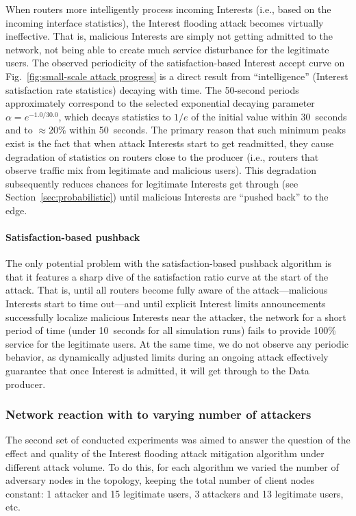 When routers more intelligently process incoming Interests (i.e., based on the incoming interface statistics), the Interest flooding attack becomes virtually ineffective.
That is, malicious Interests are simply not getting admitted to the network, not being able to create much service disturbance for the legitimate users.
The observed periodicity of the satisfaction-based Interest accept curve on Fig.~\ref{fig:small-scale attack progress} is a direct result from ``intelligence'' (Interest satisfaction rate statistics) decaying with time.
The 50-second periods approximately correspond to the selected exponential decaying parameter $\alpha=e^{−1.0/30.0}$, which decays statistics to $1/e$ of the initial value within 30~seconds and to $\approx20\%$ within 50~seconds.
The primary reason that such minimum peaks exist is the fact that when attack Interests start to get readmitted, they cause degradation of statistics on routers close to the producer (i.e., routers that observe traffic mix from legitimate and malicious users).
This degradation subsequently reduces chances for legitimate Interests get through (see Section~\ref{sec:probabilistic}) until malicious Interests are ``pushed back'' to the edge.

\paragraph{\textbf{Satisfaction-based pushback}}

The only potential problem with the satisfaction-based pushback algorithm is that it features a sharp dive of the satisfaction ratio curve at the start of the attack.
That is, until all routers become fully aware of the attack---malicious Interests start to time out---and until explicit Interest limits announcements successfully localize malicious Interests near the attacker, the network for a short period of time (under 10~seconds for all simulation runs) fails to provide 100\% service for the legitimate users.
At the same time, we do not observe any periodic behavior, as dynamically adjusted limits during an ongoing attack effectively guarantee that once Interest is admitted, it will get through to the Data producer.

\subsubsection{Network reaction with to varying number of attackers}

The second set of conducted experiments was aimed to answer the question of the effect and quality of the Interest flooding attack mitigation algorithm under different attack volume.
To do this, for each algorithm we varied the number of adversary nodes in the topology, keeping the total number of client nodes constant: 1 attacker and 15 legitimate users, 3 attackers and 13 legitimate users, etc.

